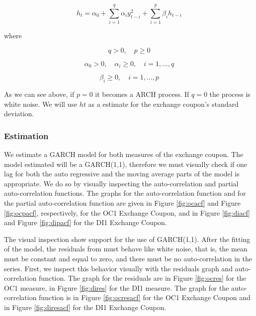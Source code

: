 \documentclass[a4paper]{article}
\begin{document}
\begin{equation}
\label{eqn:garch}
h_t = \alpha_0 + \displaystyle\sum_{i=1}^{q} \alpha_i y_{t-i}^2 + \displaystyle\sum_{i=1}^{p} \beta_i h_{t-i}
\end{equation}

where

$$q > 0, \quad   p \geq 0$$

$$\alpha_0 > 0, \quad  \alpha_i \geq 0, \quad  i=1,...,q$$

$$\beta_i \geq 0, \quad  i=1,...,p$$

As we can see above, if $p = 0$ it becomes a ARCH process. If $q = 0$ the process is white noise. We will use $ht$ as a estimate for the exchange coupon's standard deviation.







\subsubsection{Estimation}

We estimate a GARCH model for both measures of the exchange coupon. The model estimated will be a GARCH(1,1), therefore we must visually check if one lag for both the auto regressive and the moving average parts of the model is appropriate. We do so by visually inspecting the auto-correlation and partial auto-correlation functions. The graphs for the auto-correlation function and for the partial auto-correlation function are given in Figure \ref{fig:ocacf} and Figure \ref{fig:ocpacf}, respectively, for the OC1 Exchange Coupon, and in Figure \ref{fig:diacf} and Figure \ref{fig:dipacf} for the DI1 Exchange Coupon.









The visual inspection show support for the use of GARCH(1,1). After the fitting of the model, the residuals from must behave like white noise, that is, the mean must be constant and equal to zero, and there must be no auto-correlation in the series. First, we inspect this behavior visually with the residuals graph and auto-correlation function. The graph for the residuals are in Figure \ref{fig:ocres} for the OC1 measure, in Figure \ref{fig:dires} for the DI1 measure. The graph for the auto-correlation function is in Figure \ref{fig:ocresacf} for the OC1 Exchange Coupon and in Figure \ref{fig:diresacf} for the DI1 Exchange Coupon.
\end{document}
